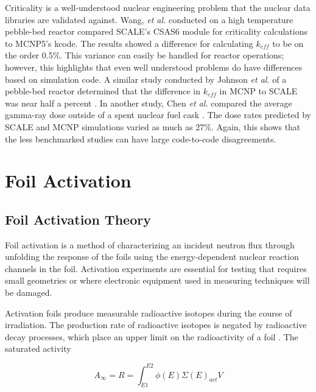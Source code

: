 Criticality is a well-understood nuclear engineering problem that the nuclear data libraries are validated against. 
Wang, \textit{et al.} conducted on a high temperature pebble-bed reactor compared SCALE's CSAS6 module for criticality calculations to MCNP5's kcode\cite{Wang2014}. 
The results showed a difference for calculating $k_{eff}$ to be on the order 0.5\%. 
This variance can easily be handled for reactor operations; however, this highlights that even well understood problems do have differences based on simulation code. 
A similar study conducted by Johnson \textit{et al.} of a pebble-bed reactor determined that the difference in $k_{eff}$ in MCNP to SCALE was near half a percent  \cite{Johnson2007}. %
In another study, Chen \textit{et al.} compared the average gamma-ray dose outside of a spent nuclear fuel cask \cite{Chen2011}. 
The dose rates predicted by SCALE and MCNP simulations varied as much as 27\%. 
Again, this shows that the less benchmarked studies can have large code-to-code disagreements. 

\section{Foil Activation}
\subsection{Foil Activation Theory}

Foil activation is a method of characterizing an incident neutron flux through unfolding the response of the foils using the energy-dependent nuclear reaction channels in the foil. 
Activation experiments are essential for testing that requires small geometries or where electronic equipment used in measuring techniques will be damaged. 

Activation foils produce measurable radioactive isotopes during the course of irradiation. 
The production rate of radioactive isotopes is negated by radioactive decay processes, which place an upper limit on the radioactivity of a foil \cite{Knoll}. 
The saturated activity 

\begin{equation} \label{eq:InfReactionRate}
A_{\infty} = R = \int_{E1}^{E2} \phi(E) \Sigma(E) _{act} V
\end{equation}

